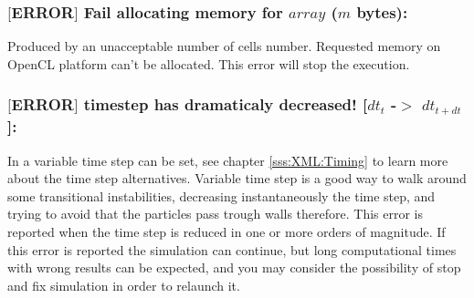 \subsubsection{$[$ERROR$]$ Fail allocating memory for $array$ ($m$ bytes):}
%
Produced by an unacceptable number of cells number. Requested memory on OpenCL
platform can't be allocated.\rc
This error will stop the \NAME execution.
%
\subsubsection{$[$ERROR$]$ timestep has dramaticaly decreased! [$dt_t$ -$>$ $dt_{t+dt}$]:}
%
In \NAME a variable time step can be set, see chapter \ref{sss:XML:Timing} to learn more
about the time step alternatives. Variable time step is a good way to walk around
some transitional instabilities, decreasing instantaneously the time step,
and trying to avoid that the particles pass trough walls therefore.\rc
This error is reported when the time step is reduced in one or more orders of
magnitude. If this error is reported the simulation can continue, but long
computational times with wrong results can be expected, and you may
consider the possibility of stop and fix simulation in order to relaunch it.
%